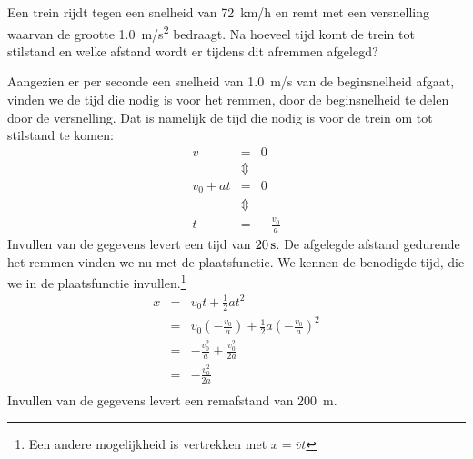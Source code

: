 

\item[\SI{80}{\percent} (b)] Een trein rijdt tegen een snelheid van \SI{72}{km/h} en remt met een versnelling waarvan de grootte \SI{1,0}{m/s^2} bedraagt. Na hoeveel tijd komt de trein tot stilstand en welke afstand wordt er tijdens dit afremmen afgelegd?

\begin{oplossing}
    Aangezien er per seconde een snelheid van \SI{1,0}{m/s} van de beginsnelheid afgaat, vinden we de tijd die nodig is voor het remmen, door de beginsnelheid te delen door de versnelling. Dat is namelijk de tijd die nodig is voor de trein om tot stilstand te komen:
    \begin{eqnarray*}
        v&=&0\\
        &\Updownarrow&\\
        v_0+at&=&0\\
        &\Updownarrow&\\
        t&=&-\frac{v_0}{a}
    \end{eqnarray*}
    Invullen van de gegevens levert een tijd van $20\rm\,s$. De afgelegde afstand gedurende het remmen vinden we nu met de plaatsfunctie. We kennen de benodigde tijd, die we in de plaatsfunctie invullen.\footnote{Een andere mogelijkheid is vertrekken met $x=\overline{v}t$}
    \begin{eqnarray*}
        x&=&v_0t+\frac{1}{2}at^2\\
        &=&v_0\left(-\frac{v_0}{a}\right)+\frac{1}{2}a\left(-\frac{v_0}{a}\right)^2\\
        &=&-\frac{v_0^2}{a}+\frac{v_0^2}{2a}\\
        &=&-\frac{v_0^2}{2a}\\
    \end{eqnarray*}
    Invullen van de gegevens levert een remafstand van \SI{200}{m}. 
\end{oplossing}